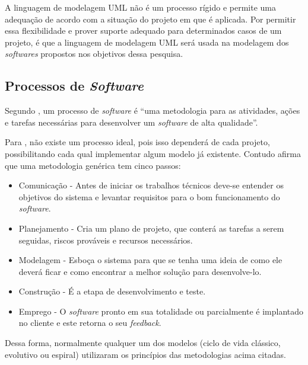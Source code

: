 		\pagebreak
		\par A linguagem de modelagem UML não é um processo rígido e permite uma
		adequação de acordo com a situação do projeto em que é aplicada. Por permitir
		essa flexibilidade e prover suporte adequado para determinados casos de um
		projeto, é que a linguagem de modelagem UML será usada na modelagem dos
		\textit{softwares} propostos nos objetivos dessa pesquisa.

	
	\subsection{Processos de \textit{Software}}
	
	
	\par Segundo , um processo de \textit{software} é
“uma metodologia para as atividades, ações e tarefas necessárias para
desenvolver um \textit{software} de alta qualidade”.

	\par Para , não existe um processo ideal, pois isso
dependerá de cada projeto, possibilitando cada qual implementar algum modelo já
existente. Contudo  afirma que uma metodologia
genérica tem cinco passos:
	\begin{itemize}
	  
	  \item Comunicação - Antes de iniciar os trabalhos técnicos deve-se entender
	  os objetivos do sistema e levantar requisitos para o bom funcionamento do
	  \textit{software}.
	  
	  \item Planejamento - Cria um plano de projeto, que conterá as tarefas a
	  serem seguidas, riscos prováveis e recursos necessários.
	  
	  \item Modelagem - Esboça o sistema para que se tenha uma ideia de como ele
	  deverá ficar e como encontrar a melhor solução para desenvolve-lo.
	  
	  \item Construção - É a etapa de desenvolvimento e teste.
	  
	  \item Emprego - O \textit{software} pronto em sua totalidade ou parcialmente
	  é implantado no cliente e este retorna o seu \textit{feedback}.
	 
	 \end{itemize}
	 
	 \par Dessa forma, normalmente qualquer um dos modelos (ciclo de vida clássico,
evolutivo ou espiral) utilizaram os princípios das metodologias acima citadas.
	
